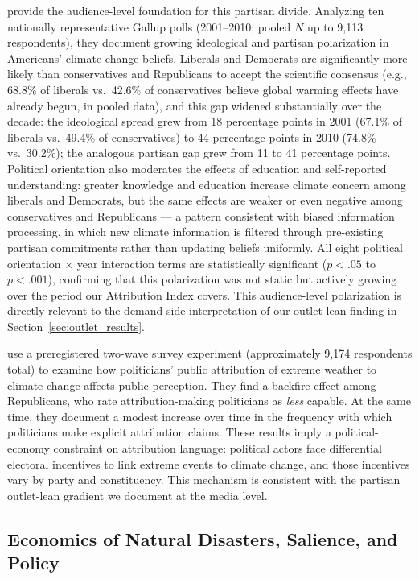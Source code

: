 \documentclass[12pt]{article}
\begin{document}
\citet{mccright2011} provide the audience-level foundation for this
partisan divide.  Analyzing ten nationally representative Gallup polls
(2001--2010; pooled $N$ up to 9{,}113 respondents), they document
growing ideological and partisan polarization in Americans' climate
change beliefs.  Liberals and Democrats are significantly more likely
than conservatives and Republicans to accept the scientific consensus
(e.g., 68.8\% of liberals vs.\ 42.6\% of conservatives believe global
warming effects have already begun, in pooled data), and this gap
widened substantially over the decade: the ideological spread grew from
18 percentage points in 2001 (67.1\% of liberals vs.\ 49.4\% of
conservatives) to 44 percentage points in 2010 (74.8\% vs.\ 30.2\%);
the analogous partisan gap grew from 11 to 41 percentage points.
Political orientation also moderates the effects of education and
self-reported understanding: greater knowledge and education increase
climate concern among liberals and Democrats, but the same effects are
weaker or even negative among conservatives and Republicans --- a
pattern consistent with biased information processing, in which new
climate information is filtered through pre-existing partisan
commitments rather than updating beliefs uniformly.  All eight
political orientation $\times$ year interaction terms are statistically
significant ($p < .05$ to $p < .001$), confirming that this polarization
was not static but actively growing over the period our Attribution
Index covers.  This audience-level polarization is directly relevant to
the demand-side interpretation of our outlet-lean finding in
Section~\ref{sec:outlet_results}.

\citet{hai2022} use a preregistered two-wave survey experiment
(approximately 9,174 respondents total) to examine how politicians'
public attribution of extreme weather to climate change affects public
perception.  They find a backfire effect among Republicans, who rate
attribution-making politicians as \emph{less} capable.  At the same
time, they document a modest increase over time in the frequency with
which politicians make explicit attribution claims.  These results imply
a political-economy constraint on attribution language: political actors
face differential electoral incentives to link extreme events to climate
change, and those incentives vary by party and constituency.  This
mechanism is consistent with the partisan outlet-lean gradient we
document at the media level.

\subsection*{Economics of Natural Disasters, Salience, and Policy}
\end{document}
